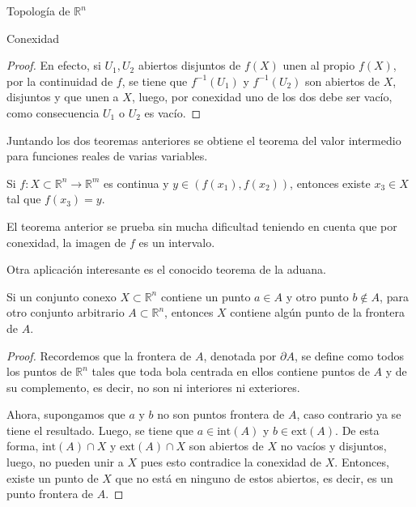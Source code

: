 \begin{chapter}{Topología de $\mathbb{R}^n$}
\begin{section}{Conexidad}
\begin{proof}
En efecto, si $U_1, U_2$ abiertos disjuntos de $f(X)$ unen al propio $f(X)$, por la continuidad de $f$, se tiene que $f^{-1}(U_1)$ y $f^{-1}(U_2)$ son abiertos de $X$, disjuntos y que unen a $X$, luego, por conexidad uno de los dos debe ser vacío, como consecuencia $U_1$ o $U_2$ es vacío.
\end{proof}

Juntando los dos teoremas anteriores se obtiene el teorema del valor intermedio para funciones reales de varias variables.

\begin{them}

Si $f: X \subset \mathbb{R}^n \to \mathbb{R}^m$ es continua y $y \in (f(x_1),f(x_2))$, entonces existe $x_3 \in X$ tal que $f(x_3) = y$.

\end{them}

El teorema anterior se prueba sin mucha dificultad teniendo en cuenta que por conexidad, la imagen de $f$ es un intervalo.

Otra aplicación interesante es el conocido teorema de la aduana.

\begin{them}

Si un conjunto conexo $X \subset \mathbb{R}^n$ contiene un punto $a \in A$ y otro punto $b \notin A$, para otro conjunto arbitrario $A \subset \mathbb{R}^n$, entonces $X$ contiene algún punto de la frontera de $A$.

\end{them}

\begin{proof}

Recordemos que la frontera de $A$, denotada por $\partial A$, se define como todos los puntos de $\mathbb{R}^n$ tales que toda bola centrada en ellos contiene puntos de $A$ y de su complemento, es decir, no son ni interiores ni exteriores.

Ahora, supongamos que $a$ y $b$ no son puntos frontera de $A$, caso contrario ya se tiene el resultado. Luego, se tiene que $a \in \text{int}(A)$ y $b \in \text{ext}(A)$. De esta forma, $\text{int}(A) \cap X$ y $\text{ext}(A) \cap X$ son abiertos de $X$ no vacíos y disjuntos, luego, no pueden unir a $X$ pues esto contradice la conexidad de $X$. Entonces, existe un punto de $X$ que no está en ninguno de estos abiertos, es decir, es un punto frontera de $A$.
\end{proof}


\end{section}
\end{chapter}
